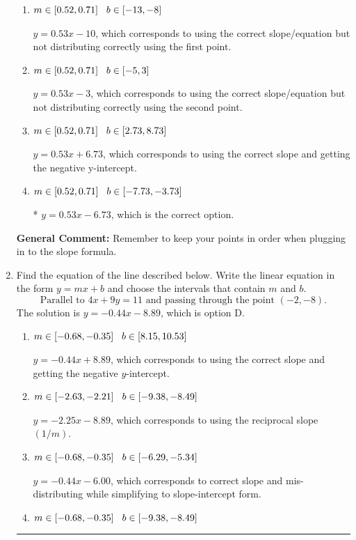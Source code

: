 \documentclass{extbook}[14pt]
\newcommand{\litem}[1]{\item #1

\rule{\textwidth}{0.4pt}}
\begin{document}
\begin{enumerate}
{\begin{enumerate}[label=\Alph*.]
 $y = -0.53x -15.27$, which corresponds to using the negative slope and the correct equation.
\item \( m \in [0.52, 0.71] \hspace*{3mm} b \in [-13, -8] \)

 $y = 0.53x -10$, which corresponds to using the correct slope/equation but not distributing correctly using the first point.
\item \( m \in [0.52, 0.71] \hspace*{3mm} b \in [-5, 3] \)

 $y = 0.53x -3$, which corresponds to using the correct slope/equation but not distributing correctly using the second point.
\item \( m \in [0.52, 0.71] \hspace*{3mm} b \in [2.73, 8.73] \)

 $y = 0.53x + 6.73$, which corresponds to using the correct slope and getting the negative y-intercept.
\item \( m \in [0.52, 0.71] \hspace*{3mm} b \in [-7.73, -3.73] \)

* $y = 0.53x -6.73$, which is the correct option.
\end{enumerate}

\textbf{General Comment:} Remember to keep your points in order when plugging in to the slope formula.
}
\litem{
Find the equation of the line described below. Write the linear equation in the form $ y=mx+b $ and choose the intervals that contain $m$ and $b$.
\[ \text{Parallel to } 4 x + 9 y = 11 \text{ and passing through the point } (-2, -8). \]The solution is \( y = -0.44x - 8.89 \), which is option D.\begin{enumerate}[label=\Alph*.]
\item \( m \in [-0.68, -0.35] \hspace*{3mm} b \in [8.15, 10.53] \)

 $y = -0.44x + 8.89$, which corresponds to using the correct slope and getting the negative $y$-intercept.
\item \( m \in [-2.63, -2.21] \hspace*{3mm} b \in [-9.38, -8.49] \)

 $y = -2.25x - 8.89$, which corresponds to using the reciprocal slope $(1/m)$.
\item \( m \in [-0.68, -0.35] \hspace*{3mm} b \in [-6.29, -5.34] \)

 $y = -0.44x - 6.00$, which corresponds to correct slope and mis-distributing while simplifying to slope-intercept form.
\item \( m \in [-0.68, -0.35] \hspace*{3mm} b \in [-9.38, -8.49] \)


\end{enumerate}}
\end{enumerate}
\end{document}
